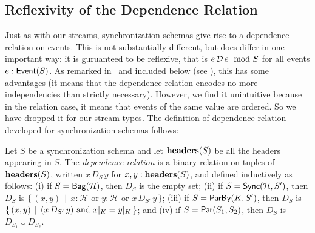 \subsection{Reflexivity of the Dependence Relation}

Just as with our streams, synchronization schemas give rise to a dependence relation on events.
This is not substantially different, but does differ in one important way: it is guruanteed to be reflexive, that is $e \,\mathcal{D}\, e \mod {S}$ for all events $e: \mathsf{Event}({S})$.
As remarked in~ and included below (see ), this has some advantages (it means that the dependence relation encodes no more independencies than strictly necessary).
However, we find it unintuitive because in the relation case, it means that events of the same value are ordered. So we have dropped it for our stream types.
The definition of dependence relation developed for synchronization schemas follows:

\begin{definition}
\label{45:def:dep-relation}
Let $S$ be a synchronization schema and let $\mathbf{headers}(S)$ be all the headers appearing in $S$.
The \emph{dependence relation} is a binary relation on tuples of $\mathbf{headers}(S)$, written $x\, D_{S}\, y$ for $x, y: \mathbf{headers}(S)$, and defined inductively as follows:
(i) if $S = \mathsf{Bag}({\mathcal{H}})$, then $D_{S}$ is the empty set;
(ii) if $S = \mathsf{Sync}({\mathcal{H}}, S')$, then
$D_{S}$ is $\{\, (x, y)\,\mid\,
    x : \mathcal{H}
    \text{ or } y : \mathcal{H}
    \text{ or } x\, D_{S'}\, y\,\}$;
(iii) if $S = \mathsf{ParBy}({K}, S')$, then
$D_{S}$ is $\{\, (x, y) \,\mid\,
    (x\, D_{S'}\, y) \text{ and } {x}|_{K} = {y}|_{K}\,\}$; and
(iv) if $S = \mathsf{Par}({S_1}, {S_2})$, then
$D_{S}$ is $D_{S_1} \cup D_{S_2}$.
\end{definition}

